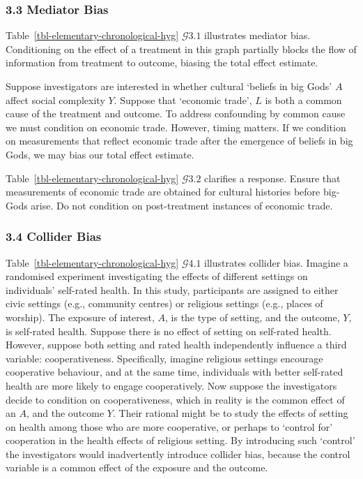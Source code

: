 \documentclass[
  single column]{article}
\begin{document}
\subsubsection{3.3 Mediator Bias}\label{mediator-bias}

Table~\ref{tbl-elementary-chronological-hyg} \(\mathcal{G} 3.1\)
illustrates mediator bias. Conditioning on the effect of a treatment in
this graph partially blocks the flow of information from treatment to
outcome, biasing the total effect estimate.

Suppose investigators are interested in whether cultural `beliefs in big
Gods' \(A\) affect social complexity \(Y\). Suppose that `economic
trade', \(L\) is both a common cause of the treatment and outcome. To
address confounding by common cause we must condition on economic trade.
However, timing matters. If we condition on measurements that reflect
economic trade after the emergence of beliefs in big Gods, we may bias
our total effect estimate.

Table~\ref{tbl-elementary-chronological-hyg} \(\mathcal{G} 3.2\)
clarifies a response. Ensure that measurements of economic trade are
obtained for cultural histories before big-Gods arise. Do not condition
on post-treatment instances of economic trade.

\subsubsection{3.4 Collider Bias}\label{collider-bias}

Table~\ref{tbl-elementary-chronological-hyg} \(\mathcal{G} 4.1\)
illustrates collider bias. Imagine a randomised experiment investigating
the effects of different settings on individuals' self-rated health. In
this study, participants are assigned to either civic settings (e.g.,
community centres) or religious settings (e.g., places of worship). The
exposure of interest, \(A\), is the type of setting, and the outcome,
\(Y\), is self-rated health. Suppose there is no effect of setting on
self-rated health. However, suppose both setting and rated health
independently influence a third variable: cooperativeness. Specifically,
imagine religious settings encourage cooperative behaviour, and at the
same time, individuals with better self-rated health are more likely to
engage cooperatively. Now suppose the investigators decide to condition
on cooperativeness, which in reality is the common effect of an \(A\),
and the outcome \(Y\). Their rational might be to study the effects of
setting on health among those who are more cooperative, or perhaps to
`control for' cooperation in the health effects of religious setting. By
introducing such `control' the investigators would inadvertently
introduce collider bias, because the control variable is a common effect
of the exposure and the outcome.
\end{document}
